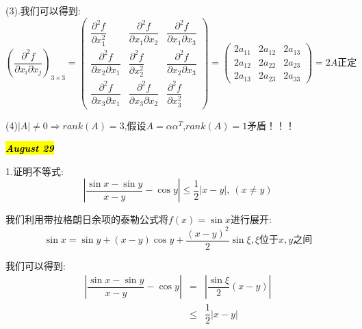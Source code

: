 \begin{solution}
(3).我们可以得到:  
$$\left( \dfrac{\partial^2 f}{\partial x_{i}\partial x_{j}}\right)_{3\times 3}=\left( \begin{matrix}
	\dfrac{\partial^2 f}{\partial x_{1}^2}&\dfrac{\partial^2 f}{\partial x_{1}\partial x_{2}}&\dfrac{\partial^2 f}{\partial x_{1}\partial x_{3}}\\
	\dfrac{\partial^2 f}{\partial x_{2}\partial x_{1}}&\dfrac{\partial^2 f}{\partial x_{2}^2}&\dfrac{\partial^2 f}{\partial x_{2}\partial x_{3}}\\
	\dfrac{\partial^2 f}{\partial x_{3}\partial x_{1}}&\dfrac{\partial^2 f}{\partial x_{3}\partial x_{2}}&\dfrac{\partial^2 f}{\partial x_{3}^2}
\end{matrix}\right)=\left( \begin{matrix}
2a_{11}&2a_{12}&2a_{13}\\
2a_{12}&2a_{22}&2a_{23}\\
2a_{13}&2a_{23}&2a_{33}
\end{matrix}\right)=2A\text{正定}$$

(4)$|A|\neq 0\Rightarrow rank(A)=3$,假设$A=\alpha\alpha^{T}$,$rank(A)=1$矛盾！！！
\end{solution}


\hl{\textbf{\textit{August 29}}}

1.证明不等式:  $$|\dfrac{\sin x-\sin y}{x-y}-\cos y|\leq \dfrac{1}{2}|x-y|,\ (x\neq y)$$
\begin{solution}

	我们利用带拉格朗日余项的泰勒公式将$f(x)=\sin x$进行展开:  
	$$\sin x=\sin y+(x-y)\cos y+\dfrac{(x-y)^2}{2}\sin\xi, \xi\text{位于}x,y\text{之间}$$
	
	我们可以得到:  
	\begin{eqnarray*}
		|\dfrac{\sin x-\sin y}{x-y}-\cos y|&=&|\dfrac{\sin\xi}{2}(x-y)|\\
		&\leq&\dfrac{1}{2}|x-y|
	\end{eqnarray*}
\end{solution}

